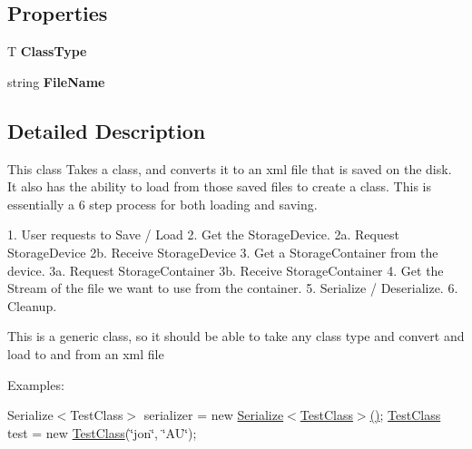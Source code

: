 \subsection*{Properties}
\begin{DoxyCompactItemize}
\item 
\hypertarget{class_custom_serialization_1_1_serialize_3_01_t_01_4_a66f70c7605f05b21815016f758632258}{T {\bfseries Class\-Type}}\label{class_custom_serialization_1_1_serialize_3_01_t_01_4_a66f70c7605f05b21815016f758632258}

\item 
\hypertarget{class_custom_serialization_1_1_serialize_3_01_t_01_4_ac97ea1c257da237df262554ec94479cf}{string {\bfseries File\-Name}}\label{class_custom_serialization_1_1_serialize_3_01_t_01_4_ac97ea1c257da237df262554ec94479cf}

\end{DoxyCompactItemize}


\subsection{Detailed Description}
This class Takes a class, and converts it to an xml file that is saved on the disk. It also has the ability to load from those saved files to create a class. This is essentially a 6 step process for both loading and saving. 

\begin{DoxyVerb}1. User requests to Save / Load
2. Get the StorageDevice.
    2a. Request StorageDevice
    2b. Receive StorageDevice
3. Get a StorageContainer from the device.
    3a. Request StorageContainer
    3b. Receive StorageContainer
4. Get the Stream of the file we want to use from the container.
5. Serialize / Deserialize.
6. Cleanup.
\end{DoxyVerb}


This is a generic class, so it should be able to take any class type and convert and load to and from an xml file

Examples\-:

Serialize$<$\-Test\-Class$>$ serializer = new \hyperlink{class_custom_serialization_1_1_serialize_3_01_t_01_4_a18418aaac4ebc3372de3410626a0ea55}{Serialize$<$\-Test\-Class$>$()}; \hyperlink{class_custom_serialization_1_1_test_class}{Test\-Class} test = new \hyperlink{class_custom_serialization_1_1_test_class}{Test\-Class}(\char`\"{}jon\char`\"{}, \char`\"{}\-A\-U\char`\"{});

